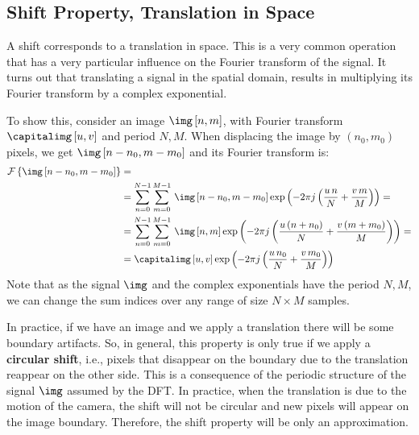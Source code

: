 \subsection{Shift Property, Translation in Space}

A shift corresponds to a translation in space. This is a very common operation that has a very particular influence on the Fourier transform of the signal. It turns out that translating a signal in the spatial domain, results in multiplying its Fourier transform by a complex exponential. 

To show this, consider an image $\img \left[n,m \right]$, with Fourier transform $\capitalimg \left[u,v \right]$ and period $N,M$. When displacing the image by $(n_0, m_0)$ pixels, we get $\img \left[n-n_0,m-m_0 \right]$ and its Fourier transform is:
\begin{equation}
\label{eq:shift}
\begin{split}
\mathcal{F} \left\{ \img\left[n-n_0,m-m_0 \right] \right\}
&= \\
 & = \sum_{n=0}^{N-1} \sum_{m=0}^{M-1} \, \img \left[n-n_0,m-m_0 \right] \exp{ \left( -2\pi j \left( \frac{u\, n}{N} + \frac{v\, m}{M} \right) \right)} = \\
& =  \sum_{n=0}^{N-1} \sum_{m=0}^{M-1} \, \img \left[n,m \right] \exp{ \left( -2\pi j \left( \frac{u\, (n+n_0)}{N} + \frac{v\, (m+m_0)}{M} \right) \right)}  = \\
& =   \capitalimg \left[u,v \right]  \exp{ \left( -2\pi j \left( \frac{u\, n_0}{N} + \frac{v\, m_0}{M} \right) \right)}
   \end{split}
\end{equation}
Note that as the signal $\img$ and the complex exponentials have the period $N,M$, we can change the sum indices over any range of size $N \times M$ samples.

In practice, if we have an image and we apply a translation there will be some boundary artifacts. So, in general, this property is only true if we apply a {\bf circular shift}, i.e., pixels that disappear on the boundary due to the translation reappear on the other side. This is a consequence of the periodic structure of the signal $\img$ assumed by the DFT. In practice, when the translation is due to the motion of the camera, the shift will not be circular and new pixels will appear on the image boundary. Therefore, the shift property will be only an approximation. 

